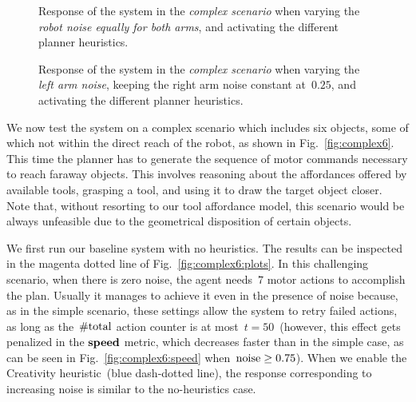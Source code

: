 \begin{figure*}
 \quad
%
 \quad
%
\caption{Response of the system in the \emph{complex scenario} when varying the \emph{robot noise equally for both arms}, and activating the different planner heuristics.}
\label{fig:complex6:plots}
%
 \quad
%
 \quad
%
\caption{Response of the system in the \emph{complex scenario} when varying the \emph{left arm noise}, keeping the right arm noise constant at~$0.25$, and activating the different planner heuristics.}
\label{fig:complex6_onearm:plots}
\end{figure*}

We now test the system on a complex scenario which includes six objects, some of which not within the direct reach of the robot, as shown in Fig.~\ref{fig:complex6}.
This time the planner has to generate the sequence of motor commands necessary to reach faraway objects. This involves reasoning about the affordances offered by available tools, grasping a tool, and using it to draw the target object closer.
Note that, without resorting to our tool affordance model, this scenario would be always unfeasible due to the geometrical disposition of certain objects.

We first run our baseline system with no heuristics.
The results can be inspected in the magenta dotted line of Fig.~\ref{fig:complex6:plots}.
In this challenging scenario, when there is zero noise, the agent needs~$7$ motor actions to accomplish the plan.
Usually it manages to achieve it even in the presence of noise because, as in the simple scenario, these settings allow the system to retry failed actions, as long as the~$\text{\#total}$ action counter is at most~$t = 50$~(however, this effect gets penalized in the $\textbf{\ensuremath{\text{speed}}}$ metric, which decreases faster than in the simple case, as can be seen in Fig.~\ref{fig:complex6:speed} when~$\text{noise} \geq 0.75$).
When we enable the Creativity heuristic~(blue dash-dotted line), the response corresponding to increasing noise is similar to the no-heuristics case.

